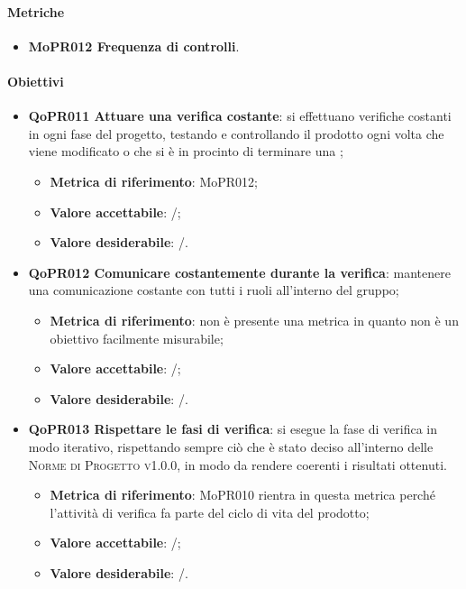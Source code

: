 \documentclass[../piano-di-qualifica.tex]{subfiles}
\begin{document}
\paragraph{Metriche}
\label{sub:metriche_4}
\begin{itemize}
    \item \textbf{MoPR012 Frequenza di controlli}.
\end{itemize}

\paragraph{Obiettivi}
\label{sub:obiettivi_4}
\begin{itemize}
    \item \textbf{QoPR011 Attuare una verifica costante}: si effettuano verifiche costanti in ogni fase del progetto, testando e controllando il prodotto ogni volta che viene modificato o che si è in procinto di terminare una ;
    \begin{itemize}
        \item \textbf{Metrica di riferimento}: MoPR012;
        \item \textbf{Valore accettabile}: /; %
        \item \textbf{Valore desiderabile}: /.
    \end{itemize}
    \item \textbf{QoPR012 Comunicare costantemente durante la verifica}: mantenere una comunicazione costante con tutti i ruoli all'interno del gruppo;
    \begin{itemize}
        \item \textbf{Metrica di riferimento}: non è presente una metrica in quanto non è un obiettivo facilmente misurabile;
        \item \textbf{Valore accettabile}: /; %
        \item \textbf{Valore desiderabile}: /.
    \end{itemize}
    \item \textbf{QoPR013 Rispettare le fasi di verifica}: si esegue la fase di verifica in modo iterativo, rispettando sempre ciò che è stato deciso all'interno delle \textsc{Norme di Progetto v1.0.0}, in modo da rendere coerenti i risultati ottenuti.
        \begin{itemize}
            \item \textbf{Metrica di riferimento}: MoPR010 rientra in questa metrica perché l'attività di verifica fa parte del ciclo di vita del prodotto;
            \item \textbf{Valore accettabile}: /; %
            \item \textbf{Valore desiderabile}: /.
        \end{itemize}
\end{itemize}
\end{document}
